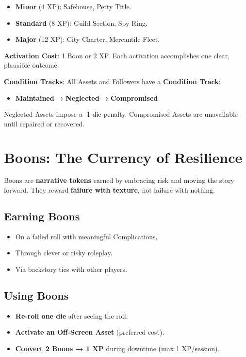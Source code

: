 \begin{itemize}
    \item \textbf{Minor} (4 XP): Safehouse, Petty Title.
    \item \textbf{Standard} (8 XP): Guild Section, Spy Ring.
    \item \textbf{Major} (12 XP): City Charter, Mercantile Fleet.
\end{itemize}

\textbf{Activation Cost}: 1 Boon or 2 XP. Each activation accomplishes one clear, plausible outcome.

\textbf{Condition Tracks}: All Assets and Followers have a \textbf{Condition Track}:

\begin{itemize}
    \item \textbf{Maintained} → \textbf{Neglected} → \textbf{Compromised}
\end{itemize}

Neglected Assets impose a -1 die penalty. Compromised Assets are unavailable until repaired or recovered.

\section*{Boons: The Currency of Resilience}

Boons are \textbf{narrative tokens} earned by embracing risk and moving the story forward. They reward \textbf{failure with texture}, not failure with nothing.

\subsection*{Earning Boons}

\begin{itemize}
    \item On a failed roll with meaningful Complications.
    \item Through clever or risky roleplay.
    \item Via backstory ties with other players.
\end{itemize}

\subsection*{Using Boons}

\begin{itemize}
    \item \textbf{Re-roll one die} after seeing the roll.
    \item \textbf{Activate an Off-Screen Asset} (preferred cost).
    \item \textbf{Convert 2 Boons → 1 XP} during downtime (max 1 XP/session).
\end{itemize}

